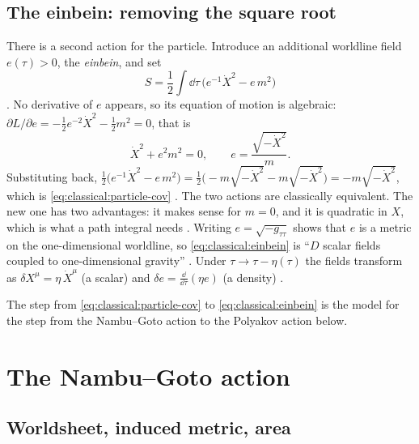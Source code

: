 \subsection{The einbein: removing the square root}\label{sec:classical:einbein}

There is a second action for the particle. Introduce an additional worldline field $e(\tau)>0$,
the \emph{einbein}, and set
\begin{equation}\label{eq:classical:einbein}
  S=\frac12\int\dd\tau\,\Big(e^{-1}\dot X^2-e\,m^2\Big)
\end{equation}
. No derivative of $e$ appears, so its equation of motion is
algebraic: $\partial L/\partial e=-\tfrac12 e^{-2}\dot X^2-\tfrac12 m^2=0$, that is
\begin{equation}\label{eq:classical:einbein-eom}
  \dot X^2+e^2m^2=0,\qquad e=\frac{\sqrt{-\dot X^2}}{m}.
\end{equation}
Substituting back,
$\tfrac12\big(e^{-1}\dot X^2-e\,m^2\big)=\tfrac12\big(-m\sqrt{-\dot X^2}-m\sqrt{-\dot X^2}\big)
=-m\sqrt{-\dot X^2}$, which is \eqref{eq:classical:particle-cov}
. The two actions are classically equivalent. The new one
has two advantages: it makes sense for $m=0$, and it is quadratic in $X$, which is what a path
integral needs . Writing $e=\sqrt{-g_{\tau\tau}}$ shows
that $e$ is a metric on the one-dimensional worldline, so \eqref{eq:classical:einbein} is
``$D$ scalar fields coupled to one-dimensional gravity'' .
Under $\tau\to\tau-\eta(\tau)$ the fields transform as $\delta X^\mu=\eta\,\dot X^\mu$ (a
scalar) and $\delta e=\frac{\dd}{\dd\tau}(\eta e)$ (a density)
.

The step from \eqref{eq:classical:particle-cov} to \eqref{eq:classical:einbein} is the model
for the step from the Nambu--Goto action to the Polyakov action below.

\section{The Nambu--Goto action}\label{sec:classical:ng}

\subsection{Worldsheet, induced metric, area}

